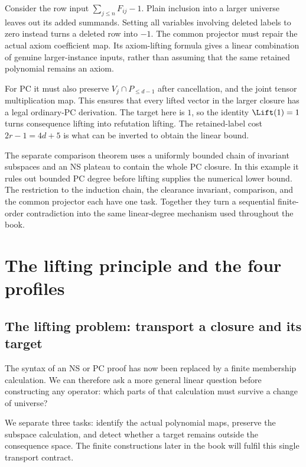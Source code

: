 \documentclass[11pt,a4paper,oneside,openany]{book}
\theoremstyle{definition}\newtheorem{definition}[theorem]{Definition}
\theoremstyle{remark}\newtheorem{remark}[theorem]{Remark}
\numberwithin{equation}{chapter}
\begin{document}
Consider the row input $\sum_{j\le n}F_{ij}-1$. Plain inclusion into
a larger universe leaves out its added summands. Setting all variables
involving deleted labels to zero instead turns a deleted row into
$-1$. The common projector must repair the actual axiom coefficient
map. Its axiom-lifting formula gives a linear combination of genuine
larger-instance inputs, rather than assuming that the same retained
polynomial remains an axiom.

For PC it must also preserve $V_j\cap P_{\le d-1}$ after cancellation,
and the joint tensor multiplication map. This ensures that every
lifted vector in the larger closure has a legal ordinary-PC derivation.
The target here is $1$, so the identity $\Lift(1)=1$ turns consequence
lifting into refutation lifting. The retained-label cost $2r-1=4d+5$
is what can be inverted to obtain the linear bound.

The separate comparison theorem uses a uniformly bounded chain of
invariant subspaces and an NS plateau to contain the whole PC closure.
In this example it rules out bounded PC degree before lifting supplies
the numerical lower bound. The restriction to the induction chain,
the clearance invariant, comparison, and the common projector each
have one task. Together they turn a sequential finite-order
contradiction into the same linear-degree mechanism used throughout
the book.

\part{The lifting principle and the four profiles}

\chapter{The lifting problem: transport a closure and its target}
\label{tx:chap:contract}
The syntax of an NS or PC proof has now been replaced by a finite
membership calculation. We can therefore ask a more general linear
question before constructing any operator: which parts of that calculation
must survive a change of universe?

We separate three tasks: identify the actual polynomial maps, preserve
the subspace calculation, and detect whether a target remains outside
the consequence space. The finite constructions later in the book
will fulfil this single transport contract.
\end{document}
